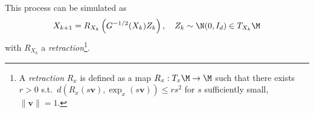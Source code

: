 %
This process can be simulated as \cite{hairer2011Solving} %
\begin{align}
X_{k+1} = R_{X_{k}} \left(G^{-1/2}(X_k) Z_k \right), \quad Z_k \sim \N(0, I_d) \in T_{X_{k}}\M 
\end{align}
with $R_{X_k}$ a \emph{retraction}\footnote{A \emph{retraction} $R_{x}$ is defined as a map $R_{x}: T_{x}\M \rightarrow \M$ such that there exists $r>0$ s.t.\ $d(R_{x}(s\bm{v}),\exp_{x}(s\bm{v})) \le rs^2$ for $s$ sufficiently small, $\|\bm{v}\|=1$.}.




